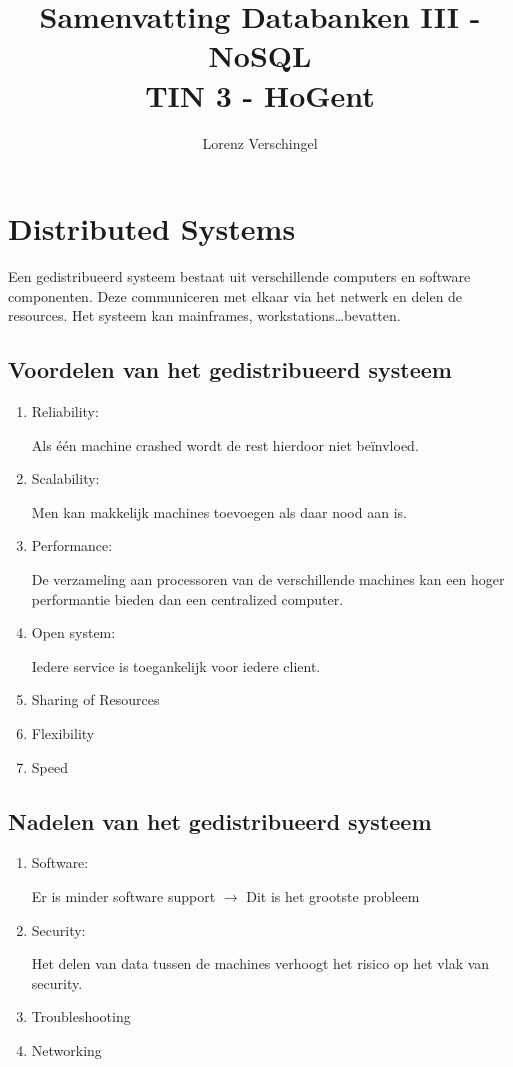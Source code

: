 \documentclass[a4paper,12pt]{article}
\title{Samenvatting Databanken III - NoSQL \\ \large TIN 3 - HoGent}
\author{Lorenz Verschingel}
\begin{document}
\maketitle
\section{Distributed Systems}
Een gedistribueerd systeem bestaat uit verschillende computers en software componenten.
Deze communiceren met elkaar via het netwerk en delen de resources.
Het systeem kan mainframes, workstations\ldots bevatten.

\subsection{Voordelen van het gedistribueerd systeem}
\begin{enumerate}
\item Reliability:

Als één machine crashed wordt de rest hierdoor niet beïnvloed.
\item Scalability:

Men kan makkelijk machines toevoegen als daar nood aan is.
\item Performance:

De verzameling aan processoren van de verschillende machines kan een hoger performantie bieden dan een centralized computer.
\item Open system:

Iedere service is toegankelijk voor iedere client.
\item Sharing of Resources
\item Flexibility
\item Speed
\end{enumerate}

\subsection{Nadelen van het gedistribueerd systeem}
\begin{enumerate}
\item Software:

Er is minder software support $\rightarrow$ Dit is het grootste probleem
\item Security:

Het delen van data tussen de machines verhoogt het risico op het vlak van security.
\item Troubleshooting
\item Networking
\end{enumerate}
\end{document}

